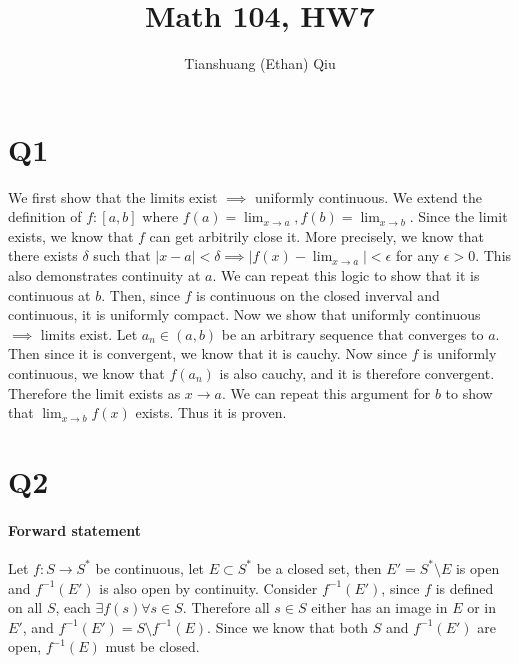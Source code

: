 \documentclass[12pt]{article}
\author{Tianshuang (Ethan) Qiu}
\begin{document}
\title{Math 104, HW7}
\maketitle
\newpage


\section{Q1}
We first show that the limits exist $\implies$ uniformly continuous. We extend the definition of $f: [a,b]$ where $f(a) = \lim_{x\to a}, f(b) = \lim_{x\to b}$. Since the limit exists, we know that $f$ can get arbitrily close it. More precisely, we know that there exists $\delta$ such that $|x-a| < \delta \implies |f(x)-\lim_{x\to a}|<\epsilon$ for any $\epsilon > 0$. This also demonstrates continuity at $a$. We can repeat this logic to show that it is continuous at $b$. Then, since $f$ is continuous on the closed inverval and continuous, it is uniformly compact.
\newline
Now we show that uniformly continuous $\implies$ limits exist. Let $a_n \in (a,b)$ be an arbitrary sequence that converges to $a$. Then since it is convergent, we know that it is cauchy. Now since $f$ is uniformly continuous, we know that $f(a_n)$ is also cauchy, and it is therefore convergent. Therefore the limit exists as $x \to a$. We can repeat this argument for $b$ to show that $\lim_{x\to b} f(x)$ exists.
\newline
Thus it is proven.
\newpage


\section{Q2}
\paragraph{Forward statement}
\newline
Let $f: S \to S^{*}$ be continuous, let $E \subset S^{*}$ be a closed set, then $E' = S^{*} \setminus E$ is open and $f^{-1}(E')$ is also open by continuity.
\newline
Consider $f^{-1}(E')$, since $f$ is defined on all $S$, each $\exists f(s) \forall s \in S$. Therefore all $s \in S$ either has an image in $E$ or in $E'$, and $f^{-1}(E') = S \setminus f^{-1}(E)$. Since we know that both $S$ and $f^{-1}(E')$ are open, $f^{-1}(E)$ must be closed.
\end{document}
